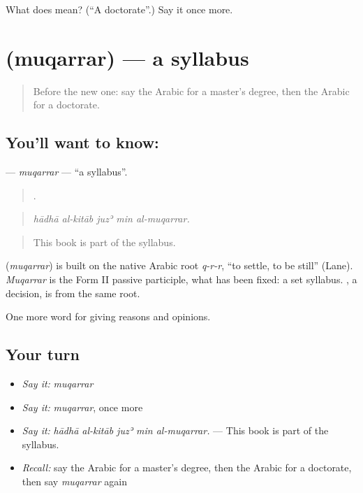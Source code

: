 \begin{tcolorbox}[breakable,colback=teal!4,colframe=teal!35!black,title={Before you move on}]
What does  mean? (\textquotedblleft{}A doctorate\textquotedblright{}.) Say it once more.
\end{tcolorbox}
\section[\texorpdfstring{\ar{مقرر} (muqarrar)}{مقرر (muqarrar)}]{ (muqarrar) — a syllabus}

\label{lesson:AR-C397-muqarrar}



\begin{quote}
Before the new one: say the Arabic for a master's degree, then the Arabic for a doctorate.
\end{quote}

\subsection*{You'll want to know: }
\textbf{} — \emph{muqarrar} — \textquotedblleft{}a syllabus\textquotedblright{}.

\begin{quote}
    .
\end{quote}

\begin{quote}
\emph{hādhā al-kitāb juzʾ min al-muqarrar.}
\end{quote}

\begin{quote}
This book is part of the syllabus.
\end{quote}

\begin{cousinweb}
\textbf{} (\emph{muqarrar}) is built on the native Arabic root \emph{q-r-r}, \textquotedblleft{}to settle, to be still\textquotedblright{} (Lane). \emph{Muqarrar} is the Form II passive participle, what has been fixed: a set syllabus. , a decision, is from the same root.
\end{cousinweb}

\begin{grammarlens}[title={What you've built}]
One more word for giving reasons and opinions.
\end{grammarlens}

\subsection*{Your turn}
\begin{itemize}
\raggedright
  \item \emph{Say it:} \emph{muqarrar}
  \item \emph{Say it:} \emph{muqarrar}, once more
  \item \emph{Say it:} \emph{hādhā al-kitāb juzʾ min al-muqarrar.} — This book is part of the syllabus.
  \item \emph{Recall:} say the Arabic for a master's degree, then the Arabic for a doctorate, then say \emph{muqarrar} again
\end{itemize}

